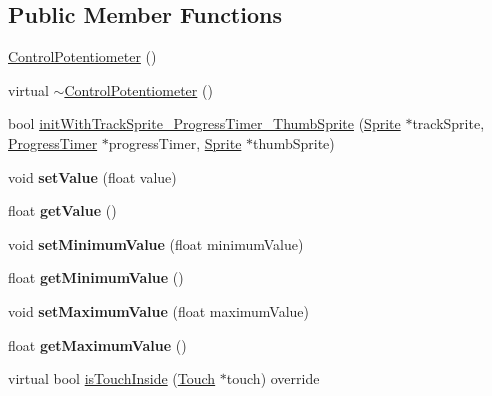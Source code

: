 \subsection*{Public Member Functions}
\begin{DoxyCompactItemize}
\item 
\hyperlink{classControlPotentiometer_a32c3e0a6d269d478e1ebad384f033dc9}{Control\+Potentiometer} ()
\item 
virtual \hyperlink{classControlPotentiometer_a154a0d88aeed45da5da4a008fe0f3c15}{$\sim$\+Control\+Potentiometer} ()
\item 
bool \hyperlink{classControlPotentiometer_afac9c374d17a3eb0b1135ae0e0b55678}{init\+With\+Track\+Sprite\+\_\+\+Progress\+Timer\+\_\+\+Thumb\+Sprite} (\hyperlink{classSprite}{Sprite} $\ast$track\+Sprite, \hyperlink{classProgressTimer}{Progress\+Timer} $\ast$progress\+Timer, \hyperlink{classSprite}{Sprite} $\ast$thumb\+Sprite)
\item 
\mbox{\label{classControlPotentiometer_a92ff5779d9e8bbc06745797365f1fef9}} 
void {\bfseries set\+Value} (float value)
\item 
\mbox{\label{classControlPotentiometer_a4fa50bbde5f1ba432997462448e08cb3}} 
float {\bfseries get\+Value} ()
\item 
\mbox{\label{classControlPotentiometer_a5b70e36ef7a99d7401efe8170e298d33}} 
void {\bfseries set\+Minimum\+Value} (float minimum\+Value)
\item 
\mbox{\label{classControlPotentiometer_af1b1bd41d07a9b660ccd41e32b28635d}} 
float {\bfseries get\+Minimum\+Value} ()
\item 
\mbox{\label{classControlPotentiometer_a7328d2e17528991d2521584acbf43639}} 
void {\bfseries set\+Maximum\+Value} (float maximum\+Value)
\item 
\mbox{\label{classControlPotentiometer_adc44b9b0966427dcf339706258b8c0d5}} 
float {\bfseries get\+Maximum\+Value} ()
\item 
virtual bool \hyperlink{classControlPotentiometer_a484e056833311821d4ea2f3ec4bde790}{is\+Touch\+Inside} (\hyperlink{classTouch}{Touch} $\ast$touch) override

\end{DoxyCompactItemize}
